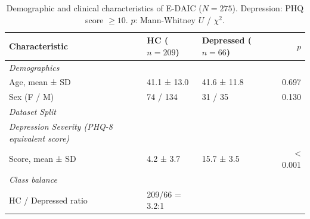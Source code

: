 \begin{table}[ht]
\centering
\footnotesize
\caption{Demographic and clinical characteristics of E-DAIC ($N=275$). Depression: PHQ score $\geq 10$. $p$: Mann-Whitney $U$ / $\chi^2$.}
\label{tab:edaic_demographics_compact}
\begin{tabular}{lllr}
\toprule
\textbf{Characteristic} & \textbf{HC ($n=209$)} & \textbf{Depressed ($n=66$)} & $p$ \\
\midrule
\textit{Demographics} & & & \\
Age, mean ± SD & 41.1 ± 13.0 & 41.6 ± 11.8 & 0.697 \\
Sex (F / M) & 74 / 134 & 31 / 35 & 0.130 \\
\textit{Dataset Split} & & & \\
\textit{Depression Severity (PHQ-8 equivalent score)} & & & \\
Score, mean ± SD & 4.2 ± 3.7 & 15.7 ± 3.5 & < 0.001 \\
\textit{Class balance} & & & \\
HC / Depressed ratio & 209/66 = 3.2:1 &  &  \\
\bottomrule
\end{tabular}
\end{table}